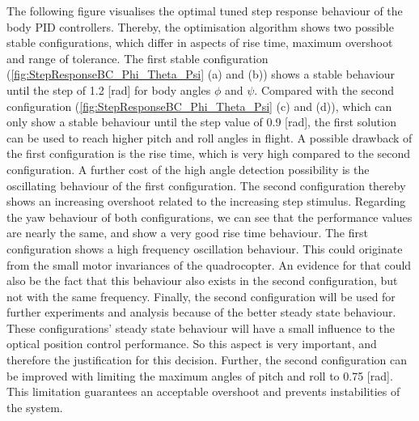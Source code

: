 The following figure visualises the optimal tuned step response behaviour of the body \gls{PID} controllers. Thereby, the
optimisation algorithm shows two possible stable configurations, which differ in aspects of rise time, maximum overshoot 
and range of tolerance. The first stable configuration (\ref{fig:StepResponseBC_Phi_Theta_Psi} (a) and (b)) shows a stable behaviour until the step of 1.2 [rad] for body angles \ensuremath{\phi} and \ensuremath{\psi}. Compared with the second configuration 
(\ref{fig:StepResponseBC_Phi_Theta_Psi} (c) and (d)), which can only show a stable behaviour until the step value of 0.9 [rad], the first solution can be used to reach higher pitch and roll angles in flight. A possible drawback of the first configuration is the rise time, which is very high compared to the second configuration. 
A further cost of the high angle detection possibility is the oscillating behaviour of the first configuration. The second configuration thereby shows an increasing overshoot related to the increasing step stimulus.
Regarding the yaw behaviour of both configurations, we can see that the performance values are nearly the same, and show a very good rise time behaviour. The first configuration shows a high frequency oscillation behaviour. This could originate from the small motor invariances of the quadrocopter. An evidence for that could also be the fact that this behaviour also exists in the second configuration, but not with the same frequency. Finally, the second configuration will be used for further experiments and analysis because of the better steady state behaviour. These configurations' steady state behaviour will have a small influence to the optical position control performance. So this aspect is very important, and therefore the justification for this decision. Further, the second configuration can be improved with limiting the maximum angles of pitch and roll to 0.75 [rad]. This limitation guarantees an acceptable overshoot and prevents instabilities of the system. 

